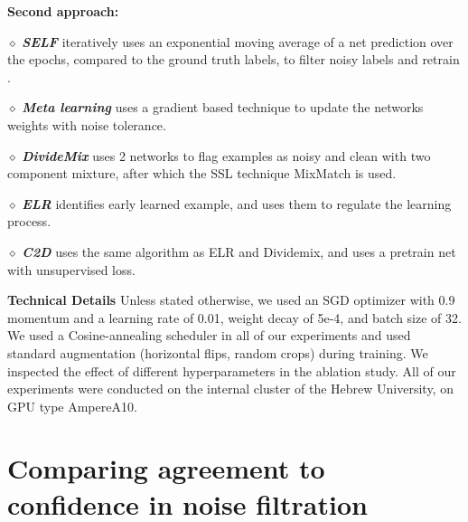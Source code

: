 \documentclass{article}
\newcommand{\myparagraph}[1]{\smallskip\noindent\textbf{#1}}
\begin{document}
\myparagraph{Second approach:} 
\begin{inparadesc} \item[$\diamond$]  \textbf{\emph{SELF}} \citep{nguyen2019self} iteratively uses an exponential moving average of a net prediction over the epochs, compared to the ground truth labels, to filter noisy labels and retrain . \item[$\diamond$]  \textbf{\emph{Meta learning}} \citep{li2019learning} uses a gradient based technique to update the networks weights with noise tolerance.
    \item[$\diamond$] \textbf{\emph{DivideMix}} \citep{li2020dividemix} uses 2 networks to flag examples as noisy and clean with two component mixture, after which the SSL technique MixMatch \citep{berthelot2019mixmatch} is used.
    \item[$\diamond$] \textbf{\emph{ELR}} \citep{liu2020early} identifies early learned example, and uses them to regulate the learning process. \item[$\diamond$] \textbf{\emph{C2D}} \citep{zheltonozhskii2022contrast} uses the same algorithm as ELR and Dividemix, and uses a pretrain net with unsupervised loss. \end{inparadesc}


\myparagraph{Technical Details}
\label{Technical}
Unless stated otherwise, we used an SGD optimizer with 0.9 momentum and a learning rate of 0.01, weight decay of 5e-4, and batch size of 32. We used a Cosine-annealing scheduler in all of our experiments and used standard augmentation (horizontal flips, random crops) during training. We inspected the effect of different hyperparameters in the ablation study. All of our experiments were conducted on the internal cluster of the Hebrew University, on GPU type AmpereA10.
 
 
\section{Comparing agreement to confidence in noise filtration}
\label{app:uri}
\end{document}
